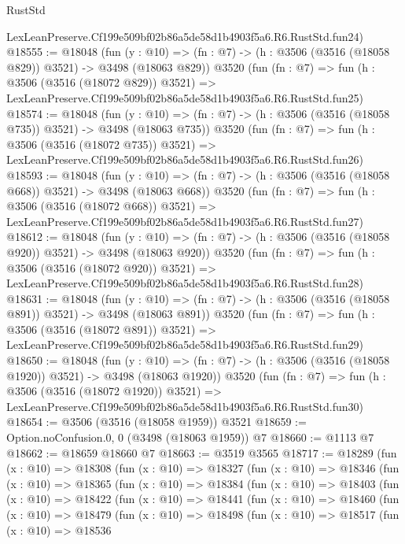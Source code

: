 \begin{lexlean}{RustStd}
\begin{coremodule}
    LexLeanPreserve.Cf199e509bf02b86a5de58d1b4903f5a6.R6.RustStd.fun24)
@18555 := @18048
    (fun (y : @10) => (fn : @7) -> (h : @3506 (@3516 (@18058 @829)) @3521) -> @3498 (@18063 @829))
    @3520
    (fun (fn : @7) =>
    fun (h : @3506 (@3516 (@18072 @829)) @3521) =>
    LexLeanPreserve.Cf199e509bf02b86a5de58d1b4903f5a6.R6.RustStd.fun25)
@18574 := @18048
    (fun (y : @10) => (fn : @7) -> (h : @3506 (@3516 (@18058 @735)) @3521) -> @3498 (@18063 @735))
    @3520
    (fun (fn : @7) =>
    fun (h : @3506 (@3516 (@18072 @735)) @3521) =>
    LexLeanPreserve.Cf199e509bf02b86a5de58d1b4903f5a6.R6.RustStd.fun26)
@18593 := @18048
    (fun (y : @10) => (fn : @7) -> (h : @3506 (@3516 (@18058 @668)) @3521) -> @3498 (@18063 @668))
    @3520
    (fun (fn : @7) =>
    fun (h : @3506 (@3516 (@18072 @668)) @3521) =>
    LexLeanPreserve.Cf199e509bf02b86a5de58d1b4903f5a6.R6.RustStd.fun27)
@18612 := @18048
    (fun (y : @10) => (fn : @7) -> (h : @3506 (@3516 (@18058 @920)) @3521) -> @3498 (@18063 @920))
    @3520
    (fun (fn : @7) =>
    fun (h : @3506 (@3516 (@18072 @920)) @3521) =>
    LexLeanPreserve.Cf199e509bf02b86a5de58d1b4903f5a6.R6.RustStd.fun28)
@18631 := @18048
    (fun (y : @10) => (fn : @7) -> (h : @3506 (@3516 (@18058 @891)) @3521) -> @3498 (@18063 @891))
    @3520
    (fun (fn : @7) =>
    fun (h : @3506 (@3516 (@18072 @891)) @3521) =>
    LexLeanPreserve.Cf199e509bf02b86a5de58d1b4903f5a6.R6.RustStd.fun29)
@18650 := @18048
    (fun (y : @10) => (fn : @7) -> (h : @3506 (@3516 (@18058 @1920)) @3521) -> @3498 (@18063 @1920))
    @3520
    (fun (fn : @7) =>
    fun (h : @3506 (@3516 (@18072 @1920)) @3521) =>
    LexLeanPreserve.Cf199e509bf02b86a5de58d1b4903f5a6.R6.RustStd.fun30)
@18654 := @3506 (@3516 (@18058 @1959)) @3521
@18659 := Option.noConfusion.{0, 0} (@3498 (@18063 @1959)) @7
@18660 := @1113 @7
@18662 := @18659 @18660 @7
@18663 := @3519 @3565
@18717 := @18289
    (fun (x : @10) =>
    @18308
      (fun (x : @10) =>
      @18327
        (fun (x : @10) =>
        @18346
          (fun (x : @10) =>
          @18365
            (fun (x : @10) =>
            @18384
              (fun (x : @10) =>
              @18403
                (fun (x : @10) =>
                @18422
                  (fun (x : @10) =>
                  @18441
                    (fun (x : @10) =>
                    @18460
                      (fun (x : @10) =>
                      @18479
                        (fun (x : @10) =>
                        @18498
                          (fun (x : @10) =>
                          @18517
                            (fun (x : @10) =>
                            @18536

\end{coremodule}
\end{lexlean}
